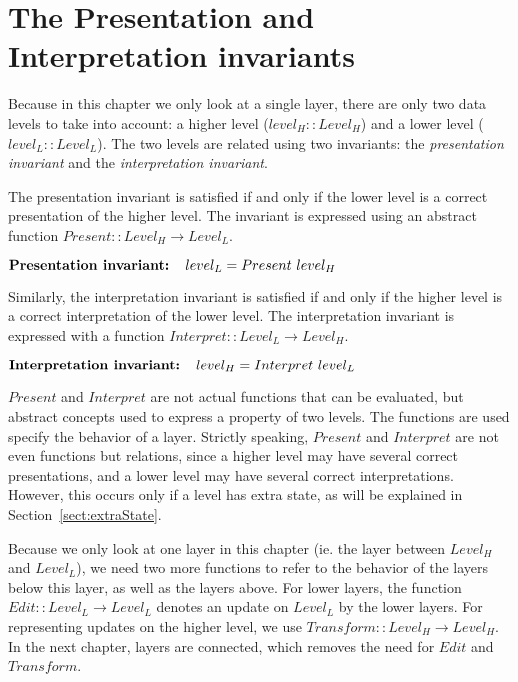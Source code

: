 \section{The Presentation and Interpretation invariants}


Because in this chapter we only look at a single layer, there are only two data levels to take into account: a higher level ($level_{H} :: Level_{H}$) and a lower level ($level_{L} :: Level_{L}$). The two levels are related using two invariants: the {\em presentation invariant} and the {\em interpretation invariant}. 

The presentation invariant is satisfied if and only if the lower level is a correct presentation of the higher level. The invariant is expressed using an abstract function 
$Present ::  Level_{H} \rightarrow Level_{L}$.

\begin{small}\begin{math}
\text{\bf Presentation invariant:~~~} level_{L} = Present~level_{H}\\
\end{math}\end{small}

Similarly, the interpretation invariant is satisfied if and only if the higher level is a correct interpretation of the lower level. The interpretation invariant is expressed with a function 
$Interpret ::  Level_{L} \rightarrow Level_{H}$.

\begin{small}\begin{math}
\text{\bf Interpretation invariant:~~~} level_{H} = Interpret~level_{L}\\
\end{math}\end{small}

$Present$ and $Interpret$ are not actual functions that can be evaluated, but abstract concepts used to express a property of two levels. The functions are used specify the behavior of a layer.
Strictly speaking, $Present$ and $Interpret$ are not even functions but relations, since a higher level may have several correct presentations, and a lower level may have several correct interpretations. However, this occurs only if a level has extra state, as will be explained in Section~\ref{sect:extraState}.

Because we only look at one layer in this chapter (ie. the layer between $Level_{H}$ and $Level_{L}$), we need two more functions to refer to the behavior of the layers below this layer, as well as the layers above. For lower layers, the function $Edit :: Level_{L} \rightarrow Level_{L}$ denotes an update on $Level_{L}$ by the lower layers. For representing updates on the higher level, we use 
$Transform :: Level_{H} \rightarrow Level_{H}$. In the next chapter, layers are connected, which removes the need for $Edit$ and $Transform$.

